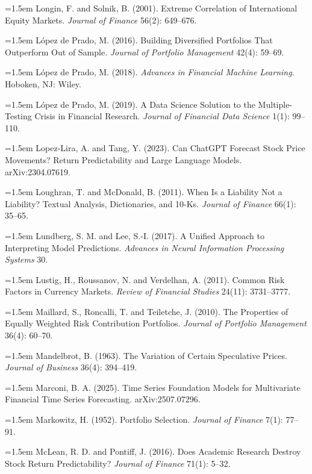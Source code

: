 \hangindent=1.5em Longin, F. and Solnik, B. (2001). Extreme Correlation of International Equity Markets. \emph{Journal of Finance} 56(2): 649--676.

\hangindent=1.5em L\'opez de Prado, M. (2016). Building Diversified Portfolios That Outperform Out of Sample. \emph{Journal of Portfolio Management} 42(4): 59--69.

\hangindent=1.5em L\'opez de Prado, M. (2018). \emph{Advances in Financial Machine Learning}. Hoboken, NJ: Wiley.

\hangindent=1.5em L\'opez de Prado, M. (2019). A Data Science Solution to the Multiple-Testing Crisis in Financial Research. \emph{Journal of Financial Data Science} 1(1): 99--110.

\hangindent=1.5em Lopez-Lira, A. and Tang, Y. (2023). Can ChatGPT Forecast Stock Price Movements? Return Predictability and Large Language Models. arXiv:2304.07619.

\hangindent=1.5em Loughran, T. and McDonald, B. (2011). When Is a Liability Not a Liability? Textual Analysis, Dictionaries, and 10-Ks. \emph{Journal of Finance} 66(1): 35--65.

\hangindent=1.5em Lundberg, S. M. and Lee, S.-I. (2017). A Unified Approach to Interpreting Model Predictions. \emph{Advances in Neural Information Processing Systems} 30.

\hangindent=1.5em Lustig, H., Roussanov, N. and Verdelhan, A. (2011). Common Risk Factors in Currency Markets. \emph{Review of Financial Studies} 24(11): 3731--3777.

\hangindent=1.5em Maillard, S., Roncalli, T. and Teiletche, J. (2010). The Properties of Equally Weighted Risk Contribution Portfolios. \emph{Journal of Portfolio Management} 36(4): 60--70.

\hangindent=1.5em Mandelbrot, B. (1963). The Variation of Certain Speculative Prices. \emph{Journal of Business} 36(4): 394--419.

\hangindent=1.5em Marconi, B. A. (2025). Time Series Foundation Models for Multivariate Financial Time Series Forecasting. arXiv:2507.07296.

\hangindent=1.5em Markowitz, H. (1952). Portfolio Selection. \emph{Journal of Finance} 7(1): 77--91.

\hangindent=1.5em McLean, R. D. and Pontiff, J. (2016). Does Academic Research Destroy Stock Return Predictability? \emph{Journal of Finance} 71(1): 5--32.

